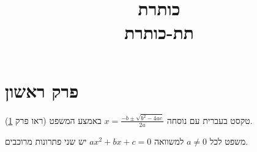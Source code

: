 \documentclass[11pt,a4paper]{article}
\title{\textbf{כותרת}\\[4pt]\large תת-כותרת}
\author{}\date{}
\begin{document}
\maketitle
\tableofcontents

\section{פרק ראשון}\label{sec:one}
טקסט בעברית עם נוסחה $x=\frac{-b\pm\sqrt{b^2-4ac}}{2a}$ באמצע המשפט (ראו פרק \ref{sec:one}).

\begin{thmbox}{משפט}
לכל $a\neq0$ למשוואה $ax^2+bx+c=0$ יש שני פתרונות מרוכבים.
\end{thmbox}
\end{document}
